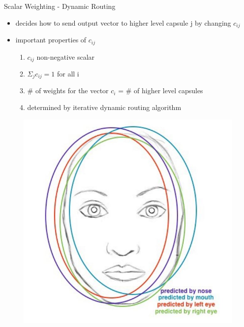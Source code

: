 \documentclass{beamer}
\begin{document}
\begin{frame}{Scalar Weighting - Dynamic Routing}
    \begin{itemize}
        \item decides how to send output vector to higher level capsule j by changing $c_{ij}$ 
        \item important properties of $c_{ij}$
        \begin{enumerate}
            \item $c_{ij}$ non-negative scalar
            \item $\Sigma_j c_{ij} = 1 $ for all i
            \item \# of weights for the vector $c_i$ = \# of higher level capsules
            \item determined by iterative dynamic routing algorithm
        \end{enumerate}
    \end{itemize}
    \begin{figure}
        \centering
        \includegraphics[scale=0.5]{overla.JPG}
    \end{figure}
\end{frame}
\end{document}
